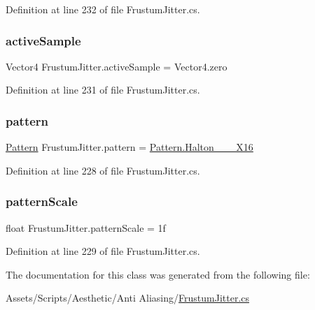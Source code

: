Definition at line 232 of file Frustum\+Jitter.\+cs.

\mbox{\label{class_frustum_jitter_aa36f188baa51ae0f98e526ebb9c7ce9e}} 
\subsubsection{\texorpdfstring{active\+Sample}{activeSample}}
{\footnotesize\ttfamily Vector4 Frustum\+Jitter.\+active\+Sample = Vector4.\+zero}



Definition at line 231 of file Frustum\+Jitter.\+cs.

\mbox{\label{class_frustum_jitter_a9caeef1e4e2e6009d2c4c1660c8ab343}} 
\subsubsection{\texorpdfstring{pattern}{pattern}}
{\footnotesize\ttfamily \mbox{\hyperlink{class_frustum_jitter_a11a9007fdc6ca37500098c619213e3d3}{Pattern}} Frustum\+Jitter.\+pattern = \mbox{\hyperlink{class_frustum_jitter_a11a9007fdc6ca37500098c619213e3d3a390fb61cff8b97c3c7dfc3b010832202}{Pattern.\+Halton\+\_\+\_\+\_\+\+X16}}}



Definition at line 228 of file Frustum\+Jitter.\+cs.

\mbox{\label{class_frustum_jitter_a57b3b58b7a2445776879406ab3bacffc}} 
\subsubsection{\texorpdfstring{pattern\+Scale}{patternScale}}
{\footnotesize\ttfamily float Frustum\+Jitter.\+pattern\+Scale = 1f}



Definition at line 229 of file Frustum\+Jitter.\+cs.



The documentation for this class was generated from the following file\+:\begin{DoxyCompactItemize}
\item 
Assets/\+Scripts/\+Aesthetic/\+Anti Aliasing/\mbox{\hyperlink{_frustum_jitter_8cs}{Frustum\+Jitter.\+cs}}\end{DoxyCompactItemize}
